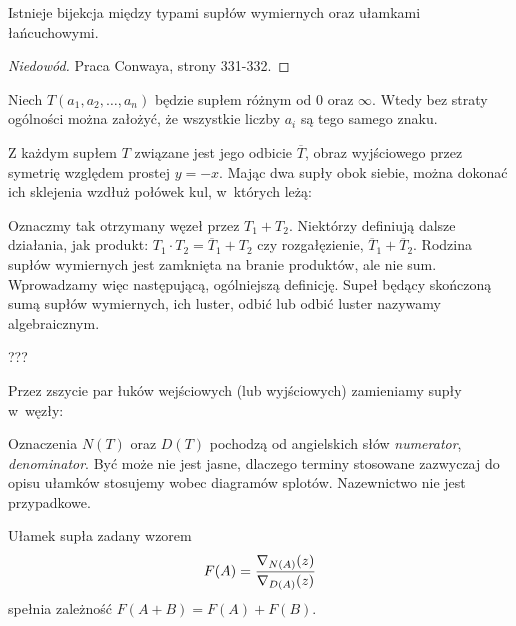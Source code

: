 \begin{proposition}
\label{prp:continued_fractions}
    Istnieje bijekcja między typami supłów wymiernych oraz ułamkami łańcuchowymi.
\end{proposition}

\begin{proof}[Niedowód]
    Praca \cite{conway70} Conwaya, strony 331-332.
\end{proof}

\begin{proposition}
\label{prp:continued_fractions_2}
    Niech $T(a_1, a_2, \ldots, a_n)$ będzie supłem różnym od $0$ oraz $\infty$.
    Wtedy bez straty ogólności można założyć, że wszystkie liczby $a_i$ są tego samego znaku.
\end{proposition}

Z każdym supłem $T$ związane jest jego odbicie $\overline T$, obraz wyjściowego przez symetrię względem prostej $y = -x$.
Mając dwa supły obok siebie, można dokonać ich sklejenia wzdłuż połówek kul, w~których leżą:


Oznaczmy tak otrzymany węzeł przez $T_1 + T_2$.
Niektórzy definiują dalsze działania, jak produkt: $T_1 \cdot T_2 = \overline T_1 + T_2$ czy rozgałęzienie, $\overline T_1 + \overline T_2$.
Rodzina supłów wymiernych jest zamknięta na branie produktów, ale nie sum.
Wprowadzamy więc następującą, ogólniejszą definicję.
Supeł będący skończoną sumą supłów wymiernych, ich luster, odbić lub odbić luster nazywamy algebraicznym.

\begin{tobedone}
    \label{conway_notation}
    ???
\end{tobedone}

Przez zszycie par łuków wejściowych (lub wyjściowych) zamieniamy supły w~węzły:


Oznaczenia $N(T)$ oraz $D(T)$ pochodzą od angielskich słów \emph{numerator}, \emph{denominator}.
Być może nie jest jasne, dlaczego terminy stosowane zazwyczaj do opisu ułamków stosujemy wobec diagramów splotów.
Nazewnictwo nie jest przypadkowe. %
\begin{proposition}
\label{prp:knot_fraction}
    Ułamek supła zadany wzorem
    \[
        F(A) = \frac{\nabla_{N(A)}(z)}{\nabla_{D(A)}(z)}
    \]
    spełnia zależność $F(A+B) = F(A) + F(B)$.
\end{proposition}

